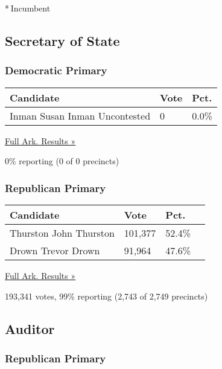 * Incumbent

\hypertarget{secretary-of-state}{%
\subsection{Secretary of State}\label{secretary-of-state}}

\hypertarget{democratic-primary-7}{%
\subsubsection{Democratic Primary}\label{democratic-primary-7}}

\begin{longtable}[]{@{}lll@{}}
\toprule
Candidate & Vote & Pct.\tabularnewline
\midrule
\endhead
 Inman Susan Inman Uncontested & 0 & 0.0\%\tabularnewline
\bottomrule
\end{longtable}

\href{https://www.nytimes3xbfgragh.onion/elections/results/arkansas}{Full
Ark. Results »}

0\% reporting (0 of 0 precincts)

\hypertarget{republican-primary-7}{%
\subsubsection{Republican Primary}\label{republican-primary-7}}

\begin{longtable}[]{@{}llll@{}}
\toprule
Candidate & Vote & Pct. &\tabularnewline
\midrule
\endhead
 Thurston John Thurston & 101,377 & 52.4\% &\tabularnewline
 Drown Trevor Drown & 91,964 & 47.6\% &\tabularnewline
\bottomrule
\end{longtable}

\href{https://www.nytimes3xbfgragh.onion/elections/results/arkansas}{Full
Ark. Results »}

193,341 votes, 99\% reporting (2,743 of 2,749 precincts)

\hypertarget{auditor}{%
\subsection{Auditor}\label{auditor}}

\hypertarget{republican-primary-8}{%
\subsubsection{Republican Primary}\label{republican-primary-8}}

